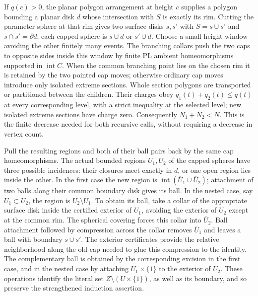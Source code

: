 If $q(c)>0$, the planar polygon arrangement at height $c$ supplies a
polygon bounding a planar disk $d$ whose intersection with $S$ is exactly
its rim. Cutting the parameter sphere at that rim gives two surface disks
$s,s'$ with $S=s\cup s'$ and $s\cap s'=\partial d$; each capped sphere
is $s\cup d$ or $s'\cup d$. Choose a small height window avoiding the other
finitely many events. The branching collars push the two caps to opposite
sides inside this window by finite PL ambient homeomorphisms supported in
$\operatorname{int}C$. When the common branching point lies on the chosen
rim it is retained by the two pointed cap moves; otherwise ordinary cap
moves introduce only isolated extreme sections. Whole section polygons
are transported or partitioned between the children. Their charges obey
$q_1(t)+q_2(t)\leq q(t)$ at every corresponding level, with a strict
inequality at the selected level; new isolated extreme sections have
charge zero. Consequently $N_1+N_2<N$. This is the finite decrease needed
for both recursive calls, without requiring a decrease in vertex count.

Pull the resulting regions and both of their ball pairs back by the same
cap homeomorphisms. The actual bounded regions $U_1,U_2$ of the capped
spheres have three possible incidences: their closures meet exactly in
$d$, or one open region lies inside the other. In the first case the new
region is $\operatorname{int}(\overline U_1\cup\overline U_2)$; attachment
of two balls along their common boundary disk gives its ball. In the
nested case, say $U_1\subset U_2$, the region is
$U_2\setminus\overline U_1$. To obtain its ball, take a collar of the
appropriate surface disk inside the certified exterior of $U_1$, avoiding
the exterior of $U_2$ except at the common rim. The spherical covering
forces this collar into $\overline U_2$. Ball attachment followed by
compression across the collar removes $\overline U_1$ and leaves a ball
with boundary $s\cup s'$. The exterior certificates provide the relative
neighborhood along the old cap needed to glue this compression to the
identity. The complementary ball is obtained by the corresponding
excision in the first case, and in the nested case by attaching
$\overline U_1\times\{1\}$ to the exterior of $U_2$. These operations
identify the literal set $Z\setminus(U\times\{1\})$, as well as its
boundary, and so preserve the strengthened induction assertion.

